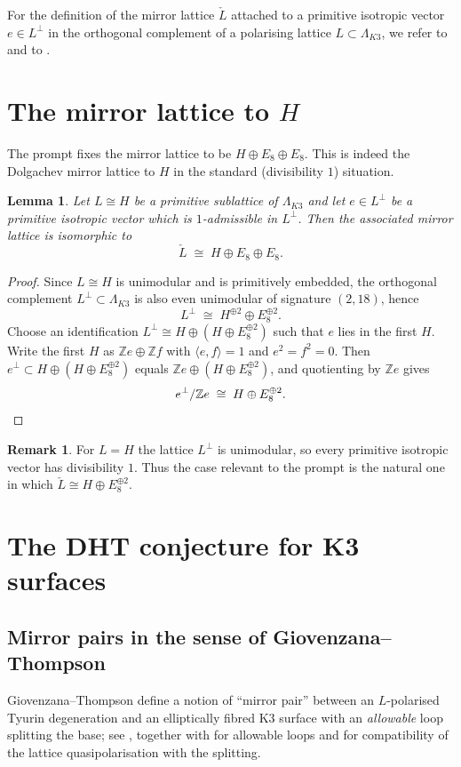 \documentclass[11pt]{amsart}
\newtheorem{lemma}[theorem]{Lemma}
\theoremstyle{definition}
\newtheorem{remark}[theorem]{Remark}
\newcommand{\Z}{\mathbb Z}
\begin{document}
For the definition of the mirror lattice $\check L$ attached to a primitive isotropic vector $e\in L^\perp$
in the orthogonal complement of a polarising lattice $L\subset \Lambda_{K3}$, we refer to
\cite[\S5]{Dol96} and to \cite[\S5.3]{dfk3slpms}.

\section{The mirror lattice to $H$}

The prompt fixes the mirror lattice to be $H\oplus E_8\oplus E_8$.
This is indeed the Dolgachev mirror lattice to $H$ in the standard (divisibility $1$) situation.

\begin{lemma}\label{lem:mirror-of-H}
Let $L\cong H$ be a primitive sublattice of $\Lambda_{K3}$ and let $e\in L^\perp$ be a primitive isotropic
vector which is $1$-admissible in $L^\perp$. Then the associated mirror lattice is isomorphic to
\[
\check L \;\cong\; H\oplus E_8\oplus E_8.
\]
\end{lemma}

\begin{proof}
Since $L\cong H$ is unimodular and is primitively embedded, the orthogonal complement $L^\perp\subset \Lambda_{K3}$
is also even unimodular of signature $(2,18)$, hence
\[
L^\perp \;\cong\; H^{\oplus 2}\oplus E_8^{\oplus 2}.
\]
Choose an identification $L^\perp\cong H\oplus (H\oplus E_8^{\oplus 2})$ such that $e$ lies in the first $H$.
Write the first $H$ as $\Z e \oplus \Z f$ with $\langle e,f\rangle=1$ and $e^2=f^2=0$.
Then $e^\perp\subset H\oplus (H\oplus E_8^{\oplus 2})$ equals $\Z e \oplus (H\oplus E_8^{\oplus 2})$,
and quotienting by $\Z e$ gives
\[
e^\perp/\Z e \;\cong\; H\oplus E_8^{\oplus 2}.\qedhere
\]
\end{proof}

\begin{remark}
For $L=H$ the lattice $L^\perp$ is unimodular, so every primitive isotropic vector has divisibility $1$.
Thus the case relevant to the prompt is the natural one in which $\check L\cong H\oplus E_8^{\oplus 2}$.
\end{remark}

\section{The DHT conjecture for K3 surfaces}

\subsection{Mirror pairs in the sense of Giovenzana--Thompson}
Giovenzana--Thompson define a notion of ``mirror pair'' between an $L$-polarised Tyurin degeneration
and an elliptically fibred K3 surface with an \emph{allowable} loop splitting the base; see
\cite[Definition~5.1]{dfk3slpms}, together with \cite[Definition~4.11]{dfk3slpms} for allowable loops and
\cite[Definition~4.21]{dfk3slpms} for compatibility of the lattice quasipolarisation with the splitting.
\end{document}
